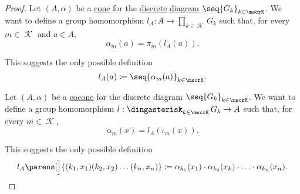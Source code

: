 \begin{proof}
   Let \( (A, \alpha) \) be a \hyperref[def:category_of_cones/cone]{cone} for the \hyperref[def:discrete_category]{discrete} \hyperref[def:categorical_diagram]{diagram} \( \seq{ G_k }_{k \in \mscrK} \). We want to define a group homomorphism \( l_A: A \to \prod_{k \in \mscrK} G_k \) such that, for every \( m \in \mscrK \) and \( a \in A \),
  \begin{equation*}
    \alpha_m(a) = \pi_m(l_A(a)).
  \end{equation*}

  This suggests the only possible definition
  \begin{equation*}
    l_A(a) \coloneqq \seq{ \alpha_m(a) }_{k \in \mscrK}.
  \end{equation*}

    Let \( (A, \alpha) \) be a \hyperref[def:category_of_cones/cocone]{cocone} for the discrete diagram \( \seq{ G_k }_{k \in \mscrK} \). We want to define a group homomorphism \( l: \Ast_{k \in \mscrK} G_k \to A \) such that, for every \( m \in \mscrK \),
  \begin{equation*}
    \alpha_m(x) = l_A(\iota_m(x)).
  \end{equation*}

  This suggests the only possible definition
  \begin{equation*}
    l_A\parens[\Big]{ (k_1, x_1) (k_2, x_2) \ldots (k_n, x_n) } \coloneqq \alpha_{k_1}(x_1) \cdot \alpha_{k_2}(x_k) \cdot \ldots \cdot \alpha_{k_n}(x_n).
  \end{equation*}
\end{proof}
